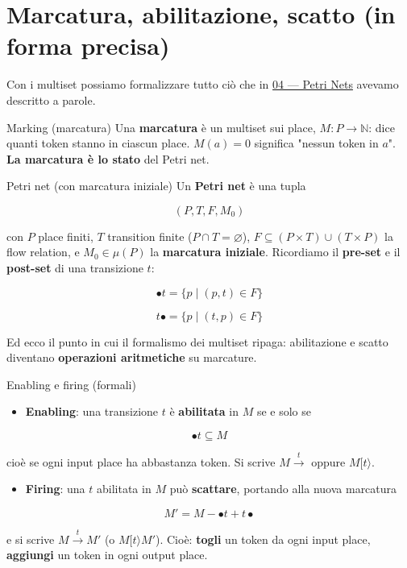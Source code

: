 \section{\texorpdfstring{Marcatura, abilitazione, scatto (in forma precisa)}{Marcatura, abilitazione, scatto (in forma precisa)}}

Con i multiset possiamo formalizzare tutto ciò che in \hyperref[ch:04]{04 — Petri Nets} avevamo descritto a parole.

\begin{boxdefinition}{Marking (marcatura)}
Una \textbf{marcatura} è un multiset sui place, $M : P \to \mathbb{N}$: dice quanti token stanno in ciascun place. $M(a) = 0$ significa "nessun token in $a$". \textbf{La marcatura è lo stato} del Petri net.
\end{boxdefinition}

\begin{boxdefinition}{Petri net (con marcatura iniziale)}
Un \textbf{Petri net} è una tupla

\[
(P, T, F, M_0)
\]

con $P$ place finiti, $T$ transition finite ($P \cap T = \varnothing$), $F \subseteq (P\times T)\cup(T\times P)$ la flow relation, e $M_0 \in \mu(P)$ la \textbf{marcatura iniziale}. Ricordiamo il \textbf{pre-set} e il \textbf{post-set} di una transizione $t$:

\[
\bullet t = \{p \mid (p,t)\in F\}
\]

\[
t\bullet = \{p \mid (t,p)\in F\}
\]
\end{boxdefinition}

Ed ecco il punto in cui il formalismo dei multiset ripaga: abilitazione e scatto diventano \textbf{operazioni aritmetiche} su marcature.

\begin{boxdefinition}{Enabling e firing (formali)}
\begin{itemize}
\item \textbf{Enabling}: una transizione $t$ è \textbf{abilitata} in $M$ se e solo se
\end{itemize}

\[
\bullet t \subseteq M
\]

cioè se ogni input place ha abbastanza token. Si scrive $M \xrightarrow{t}$ oppure $M[t\rangle$.

\begin{itemize}
\item \textbf{Firing}: una $t$ abilitata in $M$ può \textbf{scattare}, portando alla nuova marcatura
\end{itemize}

\[
M' = M - \bullet t + t\bullet
\]

e si scrive $M \xrightarrow{t} M'$ (o $M[t\rangle M'$). Cioè: \textbf{togli} un token da ogni input place, \textbf{aggiungi} un token in ogni output place.
\end{boxdefinition}

